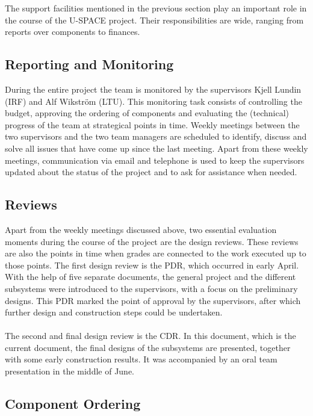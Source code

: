 The support facilities mentioned in the previous section play an important role in the course of the \ac{U-SPACE} project. Their responsibilities are wide, ranging from reports over components to finances.

\subsection{Reporting and Monitoring}

During the entire project the team is monitored by the supervisors Kjell Lundin (\ac{IRF}) and Alf Wikström (\ac{LTU}). This monitoring task consists of controlling the budget, approving the ordering of components and evaluating the (technical) progress of the team at strategical points in time. Weekly meetings between the two supervisors and the two team managers are scheduled to identify, discuss and solve all issues that have come up since the last meeting. Apart from these weekly meetings, communication via email and telephone is used to keep the supervisors updated about the status of the project and to ask for assistance when needed.

\subsection{Reviews}

Apart from the weekly meetings discussed above, two essential evaluation moments during the course of the project are the design reviews. These reviews are also the points in time when grades are connected to the work executed up to those points. The first design review is the \ac{PDR}, which occurred in early April. With the help of five separate documents, the general project and the different subsystems were introduced to the supervisors, with a focus on the preliminary designs. This \ac{PDR} marked the point of approval by the supervisors, after which further design and construction steps could be undertaken.
\\
\\
The second and final design review is the \ac{CDR}. In this document, which is the current document, the final designs of the subsystems are presented, together with some early construction results. It was accompanied by an oral team presentation in the middle of June.

\subsection{Component Ordering}

